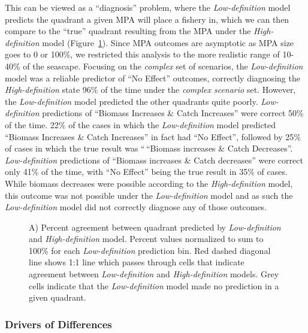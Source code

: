 \documentclass[
  default,
  lineno,
  referee]{sn-jnl}
\begin{document}
This can be viewed as a ``diagnosis'' problem, where the
\emph{Low-definition} model predicts the quadrant a given MPA will place
a fishery in, which we can then compare to the ``true'' quadrant
resulting from the MPA under the \emph{High-definition} model
(Figure~\ref{fig-agreement}). Since MPA outcomes are asymptotic as MPA
size goes to 0 or 100\%, we restricted this analysis to the more
realistic range of 10-40\% of the seascape. Focusing on the
\emph{complex} set of scenarios, the \emph{Low-definition} model was a
reliable predictor of ``No Effect'' outcomes, correctly diagnosing the
\emph{High-definition} state 96\% of the time under the \emph{complex
scenario} set. However, the \emph{Low-definition} model predicted the
other quadrants quite poorly. \emph{Low-definition} predictions of
``Biomass Increases \& Catch Increases'' were correct 50\% of the time.
22\% of the cases in which the \emph{Low-definition} model predicted
``Biomass Increases \& Catch Increases'' in fact had ``No Effect'',
followed by 25\% of cases in which the true result was ``\,``Biomass
increases \& Catch Decreases''. \emph{Low-definition} predictions of
``Biomass increases \& Catch decreases'' were correct only 41\% of the
time, with ``No Effect'' being the true result in 35\% of cases. While
biomass decreases were possible according to the \emph{High-definition}
model, this outcome was not possible under the \emph{Low-definition}
model and as such the \emph{Low-definition} model did not correctly
diagnose any of those outcomes.

\begin{figure}


\caption{\label{fig-agreement}A) Percent agreement between quadrant
predicted by \emph{Low-definition} and \emph{High-definition} model.
Percent values normalized to sum to 100\% for each \emph{Low-definition}
prediction bin. Red dashed diagonal line shows 1:1 line which passes
through cells that indicate agreement between \emph{Low-definition} and
\emph{High-definition} models. Grey cells indicate that the
\emph{Low-definition} model made no prediction in a given quadrant.}

\end{figure}%

\subsubsection{Drivers of Differences}\label{drivers-of-differences}
\end{document}

